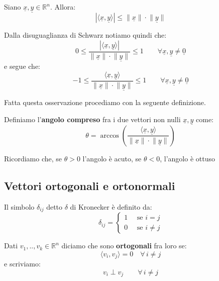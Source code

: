 \documentclass[
  a4paper,
]{article}
\begin{document}
\begin{teoremabox}
Siano \(\underline{x}, \underline{y} \in \mathbb{R}^n\). Allora: \[
| \langle \underline{x}, \underline{y} \rangle| \le \lVert \underline{x} \rVert \cdot \lVert \underline{y} \rVert
\]
\end{teoremabox}

\begin{observationbox}
Dalla disuguaglianza di Schwarz notiamo quindi che: \[
0 \leq \frac{| \langle \underline{x}, \underline{y} \rangle|}{\lVert \underline{x} \rVert \cdot \lVert \underline{y} \rVert} \leq 1 \quad\quad \forall \underline{x}, \underline{y} \not = \underline{0}
\] e segue che: \[
-1 \leq \frac{\langle \underline{x}, \underline{y} \rangle}{\lVert \underline{x} \rVert \cdot \lVert \underline{y} \rVert} \leq 1 \quad\quad \forall \underline{x}, \underline{y} \not = \underline{0}
\]
\end{observationbox}

Fatta questa osservazione procediamo con la seguente definizione.

\begin{definitionbox}
Definiamo l'\textbf{angolo compreso} fra i due vettori non nulli
\(\underline{x}, \underline{y}\) come: \[
\theta = \arccos\left(\frac{\langle \underline{x}, \underline{y} \rangle}{\lVert \underline{x} \rVert \cdot \lVert \underline{y} \rVert}\right)
\]
\end{definitionbox}

Ricordiamo che, se \(\theta > 0\) l'angolo è acuto, se \(\theta < 0\),
l'angolo è ottuso

\hypertarget{vettori-ortogonali-e-ortonormali}{%
\subsection{Vettori ortogonali e
ortonormali}\label{vettori-ortogonali-e-ortonormali}}

\begin{definitionbox}[Notazione]
Il simbolo \(\delta_{ij}\) detto \(\delta\) di Kronecker è definito da:
\[
\delta_{ij} = 
\begin{cases}
1 \quad \text{ se } i = j\\
0 \quad \text{ se } i \neq j
\end{cases}
\]
\end{definitionbox}

\begin{definitionbox}
Dati \(v_1, .., v_k \in \mathbb{R}^n\) diciamo che sono
\textbf{ortogonali} fra loro se: \[
\langle v_i, v_j \rangle = 0 \quad \forall \,i \not = j
\] e scriviamo: \[
v_i \perp v_j \qquad\forall\,i\neq j
\]
\end{definitionbox}
\end{document}
